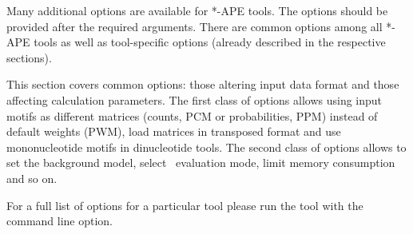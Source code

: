 Many additional options are available for *-APE tools. The options should be provided after the required arguments. There are common options among all *-APE tools as well as tool-specific options (already described in the respective sections).

This section covers common options: those altering input data format and those affecting calculation parameters.
The first class of options allows using input motifs as different matrices (counts, PCM or probabilities, PPM) instead of default weights (PWM), load matrices in transposed format and use mononucleotide motifs in dinucleotide tools.
The second class of options allows to set the background model, select \pvalue\ evaluation mode, limit memory consumption and so on.

For a full list of options for a particular tool please run the tool with the  command line option.
